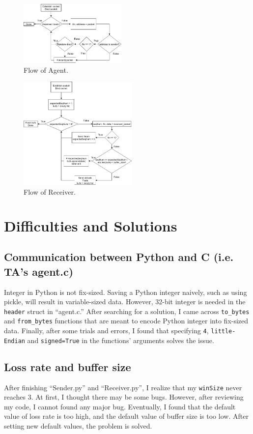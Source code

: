 \documentclass{article}
\begin{document}
\begin{figure}[h]
 \centering
 \includegraphics[width=0.47\textwidth]{Agent.png}
 \caption{Flow of Agent.}
\end{figure}

\begin{figure}[h]
 \centering
 \includegraphics[width=0.52\textwidth]{Receiver.png}
 \caption{Flow of Receiver.}
\end{figure}

\newpage
\section{Difficulties and Solutions}
\subsection{Communication between Python and C (i.e. TA's agent.c)}
Integer in Python is not fix-sized.
Saving a Python integer naively, such as using pickle, will result in variable-sized data.
However, 32-bit integer is needed in the \texttt{header} struct in ``agent.c.''
After searching for a solution, I came across \texttt{to\_bytes} and \texttt{from\_bytes} functions that are meant to encode Python integer into fix-sized data.
Finally, after some trials and errors, I found that specifying \texttt{4}, \texttt{little-Endian} and \texttt{signed=True} in the functions' arguments solves the issue.

\subsection{Loss rate and buffer size}
After finishing ``Sender.py'' and ``Receiver.py'', I realize that my \texttt{winSize} never reaches 3.
At first, I thought there may be some bugs.
However, after reviewing my code, I cannot found any major bug.
Eventually, I found that the default value of loss rate is too high, and the default value of buffer size is too low.
After setting new default values, the problem is solved.
\end{document}
